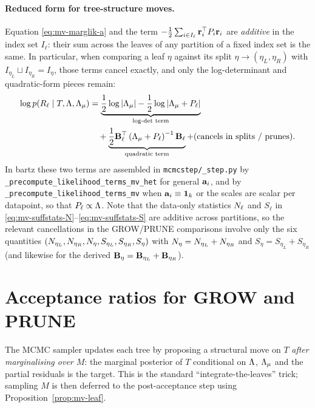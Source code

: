 \paragraph{Reduced form for tree-structure moves.}
Equation \eqref{eq:mv-marglik-a} and the term
$-\frac{1}{2}\sum_{i\in I_\ell}\mathbf{r}_i^\top P_i\mathbf{r}_i$ are \emph{additive} in
the index set $I_\ell$: their sum across the leaves of any partition of a
fixed index set is the same. In particular, when comparing a leaf $\eta$
against its split $\eta \to (\eta_L, \eta_R)$ with $I_{\eta_L} \sqcup
	I_{\eta_R} = I_\eta$, those terms cancel exactly, and only the
log-determinant and quadratic-form pieces remain:
\begin{align}
	\label{eq:mv-reduced-marglik}
	\log p(R_\ell \mid T, \Lambda, \Lambda_{\mu}) & =
	\underbrace{\frac{1}{2}\log|\Lambda_{\mu}|
		- \frac{1}{2}\log\left|\Lambda_{\mu} + P_\ell\right|}_{\text{log-det term}}
	\\
	 & \quad + \underbrace{\frac{1}{2}\mathbf{B}_\ell^\top\left(\Lambda_{\mu} + P_\ell
		\right)^{-1}\mathbf{B}_\ell}_{\text{quadratic term}}
	+ (\text{cancels in splits / prunes}).
	\notag
\end{align}
In bartz these two terms are assembled in \texttt{mcmcstep/\_step.py} by
\texttt{\_precompute\_likelihood\_terms\_mv\_het} for general $\mathbf{a}_i$, and by
\texttt{\_precompute\_likelihood\_terms\_mv} when $\mathbf{a}_i \equiv \mathbf{1}_k$ or
the scales are scalar per datapoint, so that $P_\ell \propto \Lambda$. Note
that the
data-only statistics $N_\ell$ and $S_\ell$ in
\eqref{eq:mv-suffstats-N}--\eqref{eq:mv-suffstats-S} are additive across
partitions, so the relevant cancellations in the GROW/PRUNE comparisons
involve only the six quantities
$(N_{\eta_L}, N_{\eta_R}, N_\eta, S_{\eta_L}, S_{\eta_R}, S_\eta)$ with
$N_\eta = N_{\eta_L} + N_{\eta_R}$ and
$S_\eta = S_{\eta_L} + S_{\eta_R}$ (and likewise for the derived
$\mathbf{B}_\eta = \mathbf{B}_{\eta_L} + \mathbf{B}_{\eta_R}$).

\section{Acceptance ratios for GROW and PRUNE}
\label{sec:mv-lkratios}

The MCMC sampler updates each tree by proposing a structural move on $T$
\emph{after marginalising over $M$}: the marginal posterior of $T$
conditional on $\Lambda$, $\Lambda_{\mu}$ and the partial residuals is the target. This is the
standard ``integrate-the-leaves'' trick; sampling $M$ is then deferred to
the post-acceptance step using Proposition~\ref{prop:mv-leaf}.

